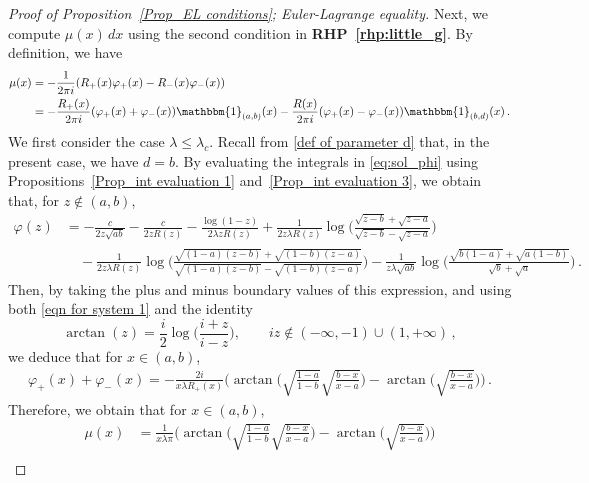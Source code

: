 \documentclass{amsart}
\theoremstyle{plain}
\theoremstyle{remark}
\numberwithin{equation}{section}
\begin{document}
\begin{proof}[Proof of Proposition~\ref{Prop_EL conditions}; Euler-Lagrange equality]
Next, we compute $\mu(x)\, dx$ using the second condition in \textbf{RHP~\ref{rhp:little_g}}. By definition, we have  
\begin{align}
\begin{split}
    \mu(x) &= -\frac{1}{2\pi i}(R_+(x)\varphi_+(x) - R_-(x)\varphi_-(x))
    \\
    &= - \frac{R_+(x)}{2\pi i} ( \varphi_+(x) + \varphi_-(x) ) \mathbbm{1}_{(a,b)}(x) - \frac{R(x)}{2\pi i}(\varphi_+(x)-\varphi_-(x))\mathbbm{1}_{(b,d)}(x)\,.
\end{split}
\end{align} 
We first consider the case $\lambda\leq \lambda_c$. Recall from \eqref{def of parameter d} that, in the present case, we have $d=b$.
By evaluating the integrals in \eqref{eq:sol_phi} using Propositions~\ref{Prop_int evaluation 1} and~\ref{Prop_int evaluation 3}, we obtain that, for $z \notin (a,b)$, 
\begin{align*}
    \varphi(z) &= -\frac{c}{2z\sqrt{ab}} - \frac{c}{2zR(z)} -\frac{\log(1-z)}{2\lambda zR(z)} +\frac{1}{2z\lambda R(z)}\log\bigg( \frac{ \sqrt{z-b}+ \sqrt{ z-a} }{ \sqrt{z-b}-\sqrt{ z-a} }\bigg)
    \\
    &\quad -\frac{1}{2z\lambda R(z)}\log\bigg( \frac{ \sqrt{(1-a)(z-b)} + \sqrt{ (1-b)(z-a)} }{  \sqrt{(1-a)(z-b)}-\sqrt{(1-b)(z-a)} }\bigg)  - \frac{1}{z\lambda \sqrt{ab}} \log\bigg( \frac{\sqrt{b(1-a)} +\sqrt{a(1-b)}}{\sqrt{b} +\sqrt{a} }\bigg)\,.
\end{align*} 
Then, by taking the plus and minus boundary values of this expression,
and using both \eqref{eqn for system 1} and the identity~\cite[Eq.~(4.23.26)]{NIST} 
\begin{equation}
    \arctan(z) = \frac{i}{2}\log \Big(\frac{i+z}{i-z}\Big), \qquad iz\not\in (-\infty,-1)\cup(1,+\infty)\,,
\end{equation}
we deduce that for $x \in (a,b)$,  
\begin{equation}
\begin{split}  
\varphi_+(x)+\varphi_-(x) =-\frac{2i}{x\lambda R_+(x)}\bigg(\arctan\bigg(\sqrt{\frac{1-a}{1-b}}\sqrt{\frac{b-x}{x-a}}\bigg) - \arctan\bigg(\sqrt{\frac{b-x}{x-a}}\bigg)\bigg)\,.
\end{split}
\end{equation}
Therefore, we obtain that for $x \in (a,b)$, 
\begin{align*}
  \mu(x) &= \frac{1}{x\lambda\pi}\bigg(\arctan\bigg(\sqrt{\frac{1-a}{1-b}}\sqrt{\frac{b-x}{x-a}}\bigg) - \arctan\bigg(\sqrt{\frac{b-x}{x-a}}\bigg)\bigg) 
       \\

\end{align*}
\end{proof}
\end{document}
